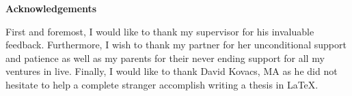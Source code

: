 
\begin{sffamily}
	{\noindent\fontsize{18pt}{21.6pt}\textbf{Acknowledgements}}
	\newline

	\noindent
	First and foremost, I would like to thank my supervisor \advisor\space for his invaluable feedback.
	Furthermore, I wish to thank my partner for her unconditional support and patience as well as my parents for their never ending support for all my ventures in live.
	Finally, I would like to thank David Kovacs, MA as he did not hesitate to help a complete stranger accomplish writing a thesis in LaTeX.

\end{sffamily}
\clearpage
